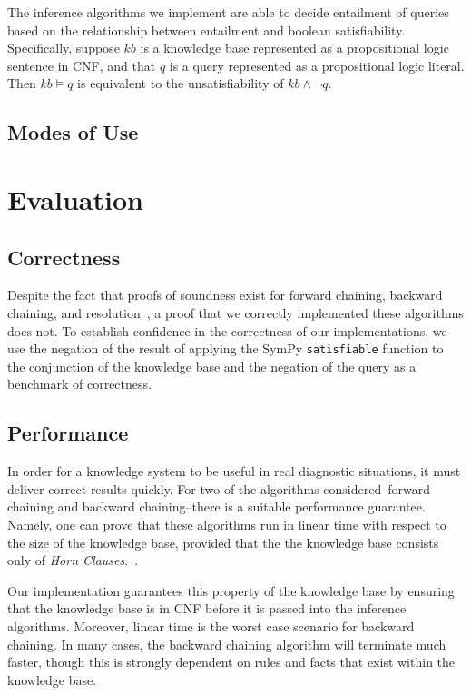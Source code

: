 \documentclass[12pt, conference, compsocconf]{IEEEtran}
\begin{document}
The inference algorithms we implement are able to decide entailment of queries based on the relationship between entailment and boolean satisfiability. 
Specifically, suppose $kb$ is a knowledge base represented as a propositional logic sentence in CNF, and that $q$ is a query represented as a propositional logic literal.
Then $kb \models q$ is equivalent to the unsatisfiability of $kb \wedge \neg q$. 

\subsection{Modes of Use}


\section{Evaluation}

\subsection{Correctness}
Despite the fact that proofs of soundness exist for forward chaining, backward chaining, and resolution~\cite{russell-norvig-aima}, a proof that we correctly implemented these algorithms does not. 
To establish confidence in the correctness of our implementations, we use the negation of the result of applying the SymPy \texttt{satisfiable} function to the conjunction of the knowledge base and the negation of the query as a benchmark of correctness. 


\subsection{Performance}
In order for a knowledge system to be useful in real diagnostic situations, it must deliver correct results quickly. 
For two of the algorithms considered--forward chaining and backward chaining--there is a suitable performance guarantee. 
Namely, one can prove that these algorithms run in linear time with respect to the size of the knowledge base, provided that the the knowledge base consists only of \emph{Horn Clauses}.~\cite{russell-norvig-aima}. 

Our implementation guarantees this property of the knowledge base by ensuring that the knowledge base is in CNF before it is passed into the inference algorithms. 
Moreover, linear time is the worst case scenario for backward chaining. 
In many cases, the backward chaining algorithm will terminate much faster, though this is strongly dependent on rules and facts that exist within the knowledge base. 
\end{document}
